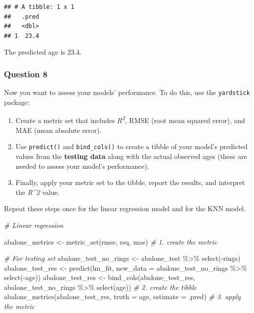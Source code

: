 \documentclass[
]{article}
\newenvironment{Shaded}{\begin{snugshade}}{\end{snugshade}}
\newcommand{\AttributeTok}[1]{\textcolor[rgb]{0.77,0.63,0.00}{#1}}
\newcommand{\CommentTok}[1]{\textcolor[rgb]{0.56,0.35,0.01}{\textit{#1}}}
\newcommand{\FunctionTok}[1]{\textcolor[rgb]{0.00,0.00,0.00}{#1}}
\newcommand{\NormalTok}[1]{#1}
\newcommand{\OtherTok}[1]{\textcolor[rgb]{0.56,0.35,0.01}{#1}}
\newcommand{\SpecialCharTok}[1]{\textcolor[rgb]{0.00,0.00,0.00}{#1}}
\providecommand{\tightlist}{%
  \setlength{\itemsep}{0pt}\setlength{\parskip}{0pt}}
\begin{document}
\begin{verbatim}
## # A tibble: 1 x 1
##   .pred
##   <dbl>
## 1  23.4
\end{verbatim}

The predicted age is 23.4.

\hypertarget{question-8}{%
\subsubsection{Question 8}\label{question-8}}

Now you want to assess your models' performance. To do this, use the
\texttt{yardstick} package:

\begin{enumerate}
\def\labelenumi{\arabic{enumi}.}
\tightlist
\item
  Create a metric set that includes \emph{R\textsuperscript{2}}, RMSE
  (root mean squared error), and MAE (mean absolute error).
\item
  Use \texttt{predict()} and \texttt{bind\_cols()} to create a tibble of
  your model's predicted values from the \textbf{testing data} along
  with the actual observed ages (these are needed to assess your model's
  performance).
\item
  Finally, apply your metric set to the tibble, report the results, and
  interpret the \emph{R\^{}2} value.
\end{enumerate}

Repeat these steps once for the linear regression model and for the KNN
model.

\begin{Shaded}
\begin{Highlighting}[]
\CommentTok{\# Linear regression}

\NormalTok{abalone\_metrics }\OtherTok{\textless{}{-}} \FunctionTok{metric\_set}\NormalTok{(rmse, rsq, mae)  }\CommentTok{\# 1. create the metric}

\CommentTok{\# For testing set}
\NormalTok{abalone\_test\_no\_rings }\OtherTok{\textless{}{-}}\NormalTok{ abalone\_test }\SpecialCharTok{\%\textgreater{}\%} \FunctionTok{select}\NormalTok{(}\SpecialCharTok{{-}}\NormalTok{rings)  }
\NormalTok{abalone\_test\_res }\OtherTok{\textless{}{-}} \FunctionTok{predict}\NormalTok{(lm\_fit, }\AttributeTok{new\_data =}\NormalTok{ abalone\_test\_no\_rings }\SpecialCharTok{\%\textgreater{}\%} \FunctionTok{select}\NormalTok{(}\SpecialCharTok{{-}}\NormalTok{age))}
\NormalTok{abalone\_test\_res }\OtherTok{\textless{}{-}} \FunctionTok{bind\_cols}\NormalTok{(abalone\_test\_res, abalone\_test\_no\_rings }\SpecialCharTok{\%\textgreater{}\%} \FunctionTok{select}\NormalTok{(age))  }\CommentTok{\# 2. create the tibble}
\FunctionTok{abalone\_metrics}\NormalTok{(abalone\_test\_res, }\AttributeTok{truth =}\NormalTok{ age, }\AttributeTok{estimate =}\NormalTok{ .pred)  }\CommentTok{\# 3. apply the metric}
\end{Highlighting}
\end{Shaded}
\end{document}
